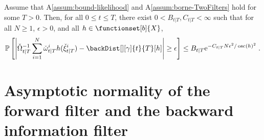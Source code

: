 \begin{prop}
\label{prop:exponential-inequality-backward}
Assume that A\ref{assum:bound-likelihood} and A\ref{assum:borne-TwoFilters} hold for some $T > 0$. Then, for all $0\le t\leq T$,
there exist $0<B_{t|T}, C_{t|T}<\infty$  such that for all $N\ge 1$, $\epsilon > 0$, and all $h \in \functionset[b]{X}$,
\begin{equation*}
 \label{eq:Hoeffding-Backward-Filtering-normalized}
\PP\left[ \left| \backsumwght{t}{T}^{-1} \sum_{i=1}^N \ebackwght{t}{T}{i} h(\ebackpart{t}{T}{i}) - \backDist[][\gamma]{t}{T}[h] \right| \geq \epsilon \right] \leq B_{t|T} \rme^{-C_{t|T} N \epsilon^2 / \oscnorm{h}^2}  \eqsp.
\end{equation*}
\end{prop}

\section{Asymptotic normality of the forward filter and the backward information filter}
\label{sec:appendix:TCL}

